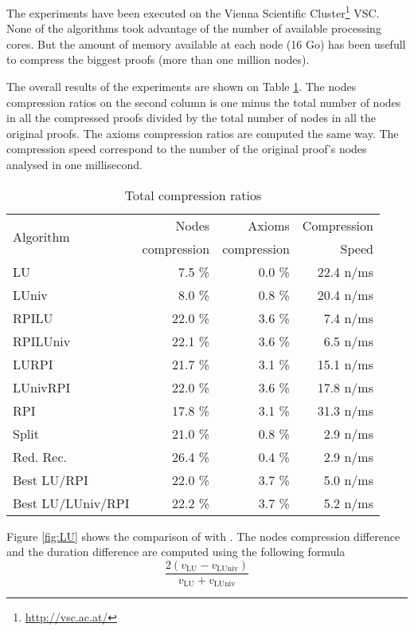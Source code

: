 \documentclass{llncs}
\begin{document}
The experiments have been executed on the Vienna Scientific
Cluster\footnote{\url{http://vsc.ac.at/}} VSC. None of the algorithms took advantage of the number
of available processing cores. But the amount of memory available at each node (16 Go) has been
usefull to compress the biggest proofs (more than one million nodes).

The overall results of the experiments are shown on Table \ref{tab:average}. The nodes compression
ratios on the second column is one minus the total number of nodes in all the compressed proofs divided
by the total number of nodes in all the original proofs. The axioms compression ratios are computed
the same way. The compression speed correspond to the number of the original proof's nodes analysed
in one millisecond.

\begin{table}[tbh]
  \caption{Total compression ratios}
  \label{tab:average}
  \centering
  \begin{tabular}{lrrr}
    \toprule
    \multirow{2}{*}{Algorithm} & Nodes       & Axioms      & Compression \\
                               & compression & compression &       Speed \\
    \midrule
    LU                &  7.5 \% &  0.0 \% & 22.4 n/ms \\
    LUniv             &  8.0 \% &  0.8 \% & 20.4 n/ms \\
    RPILU             & 22.0 \% &  3.6 \% &  7.4 n/ms \\
    RPILUniv          & 22.1 \% &  3.6 \% &  6.5 n/ms \\
    LURPI             & 21.7 \% &  3.1 \% & 15.1 n/ms \\
    LUnivRPI          & 22.0 \% &  3.6 \% & 17.8 n/ms \\
    RPI               & 17.8 \% &  3.1 \% & 31.3 n/ms \\
    Split             & 21.0 \% &  0.8 \% &  2.9 n/ms \\
    Red. Rec.         & 26.4 \% &  0.4 \% &  2.9 n/ms \\
    Best LU/RPI       & 22.0 \% &  3.7 \% &  5.0 n/ms \\
    Best LU/LUniv/RPI & 22.2 \% &  3.7 \% &  5.2 n/ms \\
    \bottomrule
  \end{tabular}
\end{table}

Figure \ref{fig:LU} shows the comparison of {\LowerUnits} with {\LowerUnivalents}. The nodes
compression difference and the duration difference are computed using the following formula
$$ \frac {2(v_{\text{LU}} - v_{\text{LUniv}})}
         {  v_{\text{LU}} + v_{\text{LUniv}} } $$
\end{document}
